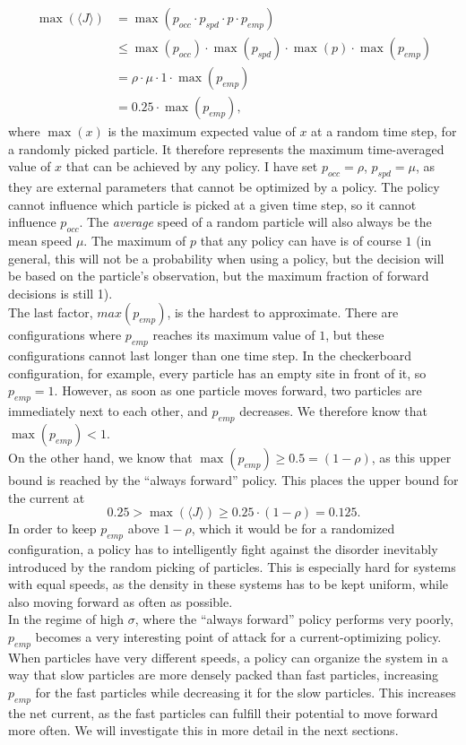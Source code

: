 \begin{align*}
    \max(\langle J\rangle) &= \max(p_{occ} \cdot p_{spd} \cdot p \cdot p_{emp}) \\
                           &\le \max(p_{occ}) \cdot \max(p_{spd}) \cdot \max(p) \cdot \max(p_{emp}) \\
                           &= \rho \cdot \mu \cdot 1 \cdot \max(p_{emp}) \\
                            &= 0.25 \cdot \max(p_{emp})\text{,}
\end{align*}
where $\max(x)$ is the maximum expected value of $x$ at a random time step, for a randomly picked particle. It therefore represents the maximum time-averaged value of $x$ that can be achieved by any policy. I have set $p_{occ}=\rho$, $p_{spd}=\mu$, as they are external parameters that cannot be optimized by a policy. The policy cannot influence which particle is picked at a given time step, so it cannot influence $p_{occ}$. The \textit{average} speed of a random particle will also always be the mean speed $\mu$. The maximum of $p$ that any policy can have is of course $1$ (in general, this will not be a probability when using a policy, but the decision will be based on the particle's observation, but the maximum fraction of forward decisions is still 1). 
\\
The last factor, $max(p_{emp})$, is the hardest to approximate. There are configurations where $p_{emp}$ reaches its maximum value of $1$, but these configurations cannot last longer than one time step. In the checkerboard configuration, for example, every particle has an empty site in front of it, so $p_{emp}=1$. However, as soon as one particle moves forward, two particles are immediately next to each other, and $p_{emp}$ decreases. We therefore know that $\max(p_{emp})<1$.
\\
On the other hand, we know that $\max(p_{emp})\ge0.5=(1-\rho)$, as this upper bound is reached by the \enquote{always forward} policy. This places the upper bound for the current at
\begin{equation}
    0.25 > \max(\langle J\rangle) \ge 0.25 \cdot (1-\rho) = 0.125 \text{.}
\end{equation}
In order to keep $p_{emp}$ above $1-\rho$, which it would be for a randomized configuration, a policy has to intelligently fight against the disorder inevitably introduced by the random picking of particles. This is especially hard for systems with equal speeds, as the density in these systems has to be kept uniform, while also moving forward as often as possible.
\\
In the regime of high $\sigma$, where the \enquote{always forward} policy performs very poorly, $p_{emp}$ becomes a very interesting point of attack for a current-optimizing policy. When particles have very different speeds, a policy can organize the system in a way that slow particles are more densely packed than fast particles, increasing $p_{emp}$ for the fast particles while decreasing it for the slow particles. This increases the net current, as the fast particles can fulfill their potential to move forward more often. We will investigate this in more detail in the next sections.


